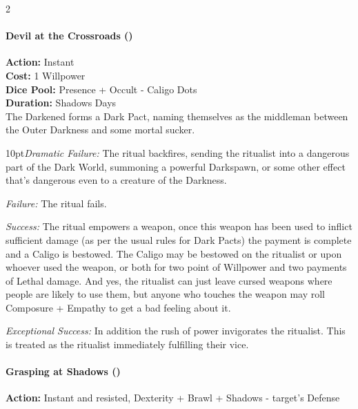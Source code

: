 \begin{multicols}{2}
\paragraph*{Devil at the Crossroads (\textbullet\textbullet)}

\noindent \textbf{Action:} Instant\\

\noindent \textbf{Cost:} 1 Willpower \\

\noindent \textbf{Dice Pool:} Presence + Occult - Caligo Dots\\

\noindent \textbf{Duration:} Shadows Days \\

\noindent The Darkened forms a Dark Pact, naming themselves as the middleman between the Outer Darkness and some mortal sucker. 

    \begin{myindentpar}{10pt}\emph{Dramatic Failure:} The ritual backfires, sending the ritualist into a dangerous part of the Dark World, summoning a powerful Darkspawn, or some other effect that's dangerous even to a creature of the Darkness. 
    
    \emph{Failure:} The ritual fails. 
    
    \emph{Success:} The ritual empowers a weapon, once this weapon has been used to inflict sufficient damage (as per the usual rules for Dark Pacts) the payment is complete and a Caligo is bestowed. The Caligo may be bestowed on the ritualist or upon whoever used the weapon, or both for two point of Willpower and two payments of Lethal damage. And yes, the ritualist can just leave cursed weapons where people are likely to use them, but anyone who touches the weapon may roll Composure + Empathy to get a bad feeling about it. 
    
    \emph{Exceptional Success:}  In addition the rush of power invigorates the ritualist. This is treated as the ritualist immediately fulfilling their vice. \\\end{myindentpar}
	
	
\paragraph*{Grasping at Shadows (\textbullet\textbullet)}

\noindent \textbf{Action:} Instant and resisted, Dexterity + Brawl + Shadows - target's Defense\\


\end{multicols}
